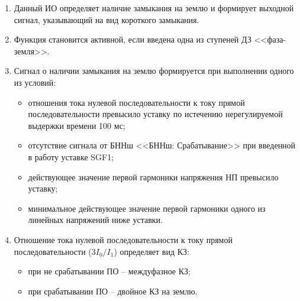 \begin{enumerate}[label=\arabic{section}.\arabic{subsection}.\arabic{enumi}, labelsep=4pt, leftmargin=0pt, itemindent=57pt, itemsep=0pt, parsep=5pt]
\begin{enumerate}[label=\arabic{section}.\arabic{subsection}.\arabic{enumi}.\arabic*, labelsep=4pt, leftmargin=0em, itemindent=65pt, parsep=0pt]
\item    
Данный ИО определяет наличие замыкания на землю и формирует выходной сигнал, указывающий на вид короткого замыкания. 
\item 
Функция становится активной, если введена одна из ступеней ДЗ <<фаза-земля>>. 
\item 
Сигнал о наличии замыкания на землю формируется при выполнении одного из условий:
\begin{itemize} 
    \item отношения  тока  нулевой  последовательности  к  току  прямой  последовательности  превысило уставку по истечению нерегулируемой выдержки времени 100 мс; 
    \item отсутствие сигнала от БННш <<БННш: Срабатывание>> при введенной в работу уставке SGF1; 
    \item действующее значение первой гармоники напряжения НП превысило уставку; 
    \item минимальное действующее значение первой гармоники одного из линейных напряжений ниже уставки. 
\end{itemize}

\item 
Отношение  тока  нулевой  последовательности  к  току  прямой  последовательности  ($3I_0/I_1$) определяет вид КЗ:
\begin{itemize}  
    \item при не срабатывании ПО -- междуфазное КЗ; 
    \item при срабатывании ПО -- двойное КЗ на землю. 
\end{itemize}


\end{enumerate}
\end{enumerate}
